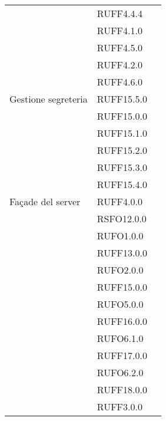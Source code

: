 \begin{center}
\begin{longtable}{lp{}l}
 & RUFF4.4.4 \\
 & RUFF4.1.0 \\
 & RUFF4.5.0 \\
 & RUFF4.2.0 \\
 & RUFF4.6.0 \\
Gestione segreteria & RUFF15.5.0 \\
 & RUFF15.0.0 \\
 & RUFF15.1.0 \\
 & RUFF15.2.0 \\
 & RUFF15.3.0 \\
 & RUFF15.4.0 \\
Façade del server & RUFF4.0.0 \\
 & RSFO12.0.0 \\
 & RUFO1.0.0 \\
 & RUFF13.0.0 \\
 & RUFO2.0.0 \\
 & RUFF15.0.0 \\
 & RUFO5.0.0 \\
 & RUFF16.0.0 \\
 & RUFO6.1.0 \\
 & RUFF17.0.0 \\
 & RUFO6.2.0 \\
 & RUFF18.0.0 \\
 & RUFF3.0.0 \\
 

\end{longtable}
\end{center}
